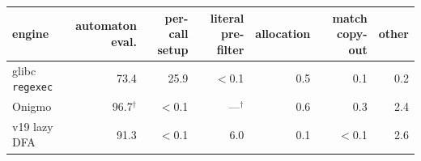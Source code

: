 \begin{tabular}{lrrrrrr}
\toprule
engine & automaton eval. & per-call setup & literal pre-filter & allocation & match copy-out & other \\
\midrule
glibc \texttt{regexec} & 73.4 & 25.9 & $<$0.1 & 0.5 & 0.1 & 0.2 \\
Onigmo & 96.7$^{\dagger}$ & $<$0.1 & ---$^{\dagger}$ & 0.6 & 0.3 & 2.4 \\
v19 lazy DFA & 91.3 & $<$0.1 & 6.0 & 0.1 & $<$0.1 & 2.6 \\
\bottomrule
\end{tabular}

